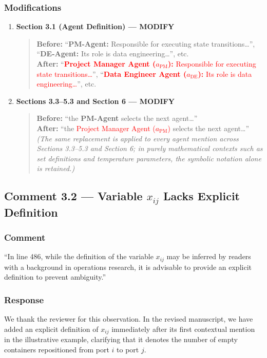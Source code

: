\documentclass[11pt,a4paper]{article}
\begin{document}
\subsubsection{Modifications}
\begin{enumerate}
\item \textbf{Section 3.1 (Agent Definition) --- MODIFY}
\begin{quote}
\textbf{Before:} ``\textbf{PM-Agent:} Responsible for executing state transitions\ldots'', ``\textbf{DE-Agent:} Its role is data engineering\ldots'', etc.\\[4pt]
\textbf{After:} ``\textcolor{red}{\textbf{Project Manager Agent ($a_{\text{PM}}$):} Responsible for executing state transitions\ldots}'', ``\textcolor{red}{\textbf{Data Engineer Agent ($a_{\text{DE}}$):} Its role is data engineering\ldots}'', etc.
\end{quote}
\item \textbf{Sections 3.3--5.3 and Section 6 --- MODIFY}
\begin{quote}
\textbf{Before:} ``the \textbf{PM-Agent} selects the next agent\ldots''\\[4pt]
\textbf{After:} ``the \textcolor{red}{Project Manager Agent ($a_{\text{PM}}$)} selects the next agent\ldots''\\[4pt]
\textit{(The same replacement is applied to every agent mention across Sections 3.3--5.3 and Section 6; in purely mathematical contexts such as set definitions and temperature parameters, the symbolic notation alone is retained.)}
\end{quote}
\end{enumerate}

\subsection{Comment 3.2 --- Variable $x_{ij}$ Lacks Explicit Definition}

\subsubsection{Comment}
``In line 486, while the definition of the variable $x_{ij}$ may be inferred by readers with a background in operations research, it is advisable to provide an explicit definition to prevent ambiguity.''

\subsubsection{Response}
We thank the reviewer for this observation. In the revised manuscript, we have added an explicit definition of $x_{ij}$ immediately after its first contextual mention in the illustrative example, clarifying that it denotes the number of empty containers repositioned from port $i$ to port $j$.
\end{document}
